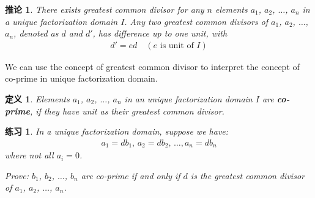 \documentclass[utf8]{ctexbook}
\newtheorem{definition}{定义}[section]
\newtheorem{corollary}{推论}[section]
\newtheorem{exercise}{练习}[section]
\begin{document}
\begin{corollary}
There exists greatest common divisor for any $n$ elements $a_1$, $a_2$, $\ldots$, $a_n$ in a unique factorization domain $I$. Any two greatest common divisors of $a_1$, $a_2$, $\ldots$, $a_n$, denoted as $d$ and $d'$, has difference up to one unit, with
\begin{align*}
d' = e d \quad (e \mbox{ is unit of } I)
\end{align*} 
\end{corollary}

We can use the concept of greatest common divisor to interpret the concept of co-prime in unique factorization domain.

\begin{definition}
\label{def_UFD_co_prime}
Elements $a_1$, $a_2$, $\ldots$, $a_n$ in an unique factorization domain $I$ are \textbf{co-prime}, if they have unit as their greatest common divisor.
\end{definition}


\begin{exercise}\label{exercise_UFD_1}
In a unique factorization domain, suppose we have:
\begin{align*}
a_1 = d b_1, \, a_2 = d b_2, \, \ldots, a_n = d b_n 
\end{align*}
where not all $a_i = 0$.
 
Prove: $b_1$, $b_2$, $\ldots$, $b_n$ are co-prime if and only if $d$ is the greatest common divisor of $a_1$, $a_2$, $\ldots$, $a_n$.

\end{exercise}
\end{document}
